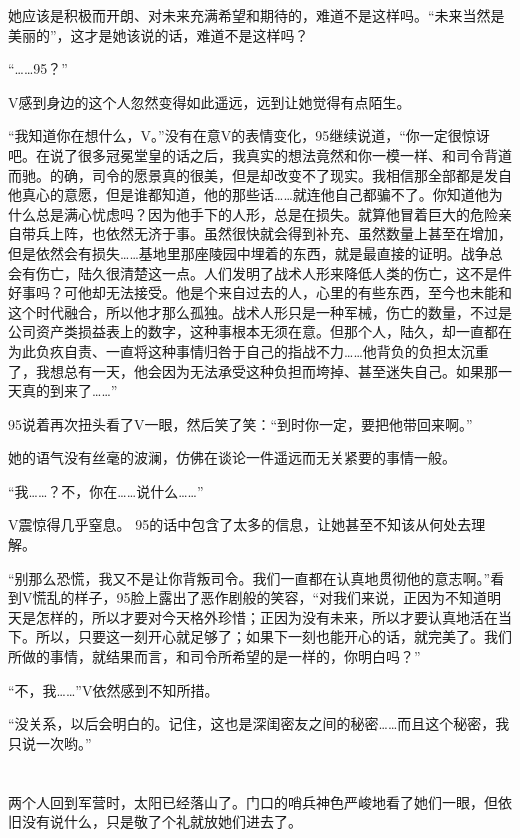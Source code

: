 她应该是积极而开朗、对未来充满希望和期待的，难道不是这样吗。“未来当然是美丽的”，这才是她该说的话，难道不是这样吗？

“……95？”

V感到身边的这个人忽然变得如此遥远，远到让她觉得有点陌生。

“我知道你在想什么，V。”没有在意V的表情变化，95继续说道，“你一定很惊讶吧。在说了很多冠冕堂皇的话之后，我真实的想法竟然和你一模一样、和司令背道而驰。的确，司令的愿景真的很美，但是却改变不了现实。我相信那全部都是发自他真心的意愿，但是谁都知道，他的那些话……就连他自己都骗不了。你知道他为什么总是满心忧虑吗？因为他手下的人形，总是在损失。就算他冒着巨大的危险亲自带兵上阵，也依然无济于事。虽然很快就会得到补充、虽然数量上甚至在增加，但是依然会有损失……基地里那座陵园中埋着的东西，就是最直接的证明。战争总会有伤亡，陆久很清楚这一点。人们发明了战术人形来降低人类的伤亡，这不是件好事吗？可他却无法接受。他是个来自过去的人，心里的有些东西，至今也未能和这个时代融合，所以他才那么孤独。战术人形只是一种军械，伤亡的数量，不过是公司资产类损益表上的数字，这种事根本无须在意。但那个人，陆久，却一直都在为此负疚自责、一直将这种事情归咎于自己的指战不力……他背负的负担太沉重了，我想总有一天，他会因为无法承受这种负担而垮掉、甚至迷失自己。如果那一天真的到来了……”

95说着再次扭头看了V一眼，然后笑了笑：“到时你一定，要把他带回来啊。”

她的语气没有丝毫的波澜，仿佛在谈论一件遥远而无关紧要的事情一般。

“我……？不，你在……说什么……”	

V震惊得几乎窒息。 95的话中包含了太多的信息，让她甚至不知该从何处去理解。

“别那么恐慌，我又不是让你背叛司令。我们一直都在认真地贯彻他的意志啊。”看到V慌乱的样子，95脸上露出了恶作剧般的笑容，“对我们来说，正因为不知道明天是怎样的，所以才要对今天格外珍惜；正因为没有未来，所以才要认真地活在当下。所以，只要这一刻开心就足够了；如果下一刻也能开心的话，就完美了。我们所做的事情，就结果而言，和司令所希望的是一样的，你明白吗？”

“不，我……”V依然感到不知所措。

“没关系，以后会明白的。记住，这也是深闺密友之间的秘密……而且这个秘密，我只说一次哟。”



\section*{}

两个人回到军营时，太阳已经落山了。门口的哨兵神色严峻地看了她们一眼，但依旧没有说什么，只是敬了个礼就放她们进去了。

